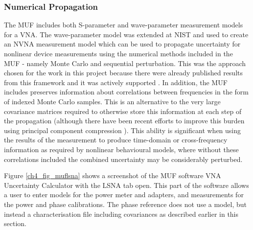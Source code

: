 \documentclass[../thesis/thesis.tex]{subfiles}
\begin{document}
\subsubsection{Numerical Propagation}

The MUF includes both S-parameter and wave-parameter measurement models for a VNA. The wave-parameter model was extended at NIST and used to create an NVNA measurement model which can be used to propagate uncertainty for nonlinear device measurements using the numerical methods included in the MUF - namely Monte Carlo and sequential perturbation. This was the approach chosen for the work in this project because there were already published results from this framework and it was actively supported \cite{Avolio_2015}. In addition, the MUF includes preserves information about correlations between frequencies in the form of indexed Monte Carlo samples. This is an alternative to the very large covariance matrices required to otherwise store this information at each step of the propagation (although there have been recent efforts to improve this burden using principal component compression \cite{Humphreys_2015}). This ability is significant when using the results of the measurement to produce time-domain or cross-frequency information as required by nonlinear behavioural models, where without these correlations included the combined uncertainty may be considerably perturbed.

Figure \ref{ch4_fig_muflsna} shows a screenshot of the MUF software VNA Uncertainty Calculator with the LSNA tab open. This part of the software allows a user to enter models for the power meter and adapters, and measurements for the power and phase calibrations. The phase reference does not use a model, but instead a characterisation file including covariances as described earlier in this section.
\end{document}
